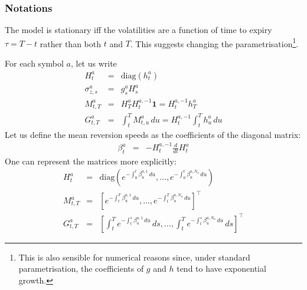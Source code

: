 \documentclass[11pt,english]{amsart}
\newcommand{\diag}{\mathrm{diag}}
\newcommand{\vun}{\mathbf{1}}
\theoremstyle{definition}
\begin{document}
\subsubsection{Notations}
The model is stationary iff the volatilities are a function of time to expiry $\tau = T-t$ rather than both $t$ and $T$. This suggests changing the parametrisation\footnote{This is also sensible for numerical reasons since, under standard parametrisation, the coefficients of $g$ and $h$ tend to have exponential growth.}. 

For each symbol $a$, let us write
\begin{eqnarray}
  H^a_{t} &=& \diag(h^a_t)  \\
  \sigma^a_{z,s} &=& g^a_sH^a_s  \\ 
  M^a_{t,T} &=& H^a_T H^{a,-1}_t \vun = H^{a,-1}_t h^a_T  \\
  G^a_{t,T} &=& \int_t^T M^a_{t,u} \, du = H^{a,-1}_t \int_t^T h^a_u \, du %
\end{eqnarray}
Let us define the mean reversion speeds as the coefficients of the diagonal matrix: 
\begin{eqnarray}
  \beta^a_{t} &=&  - H^{a,-1}_{t} \frac{d}{dt}H^a_{t}  
\end{eqnarray}
One can represent the matrices more explicitly:
\begin{eqnarray}
  H^a_{t} &=& \diag\left( e^{-\int_0^t \beta^{a,1}_u \, du} , \ldots, e^{-\int_0^t \beta^{a,N_a}_u \, du} \right)  \\
  M^a_{t,T} &=& \left[ e^{-\int_t^T \beta^{a,1}_u \, du} , \ldots, e^{-\int_t^T \beta^{a,N_a}_u \, du} \right]^\top  \\
  G^a_{t,T} &=& \left[ \int_t^T e^{-\int_t^s \beta^{a,1}_u \, du} \, ds , \ldots,  \int_t^T e^{-\int_t^s \beta^{a,N_a}_u \, du} \, ds \right]^\top  
\end{eqnarray}
\end{document}
